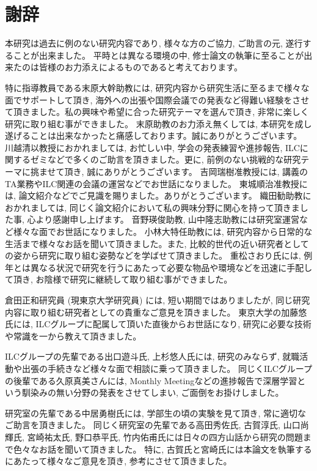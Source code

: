 
\clearpage

\chapter*{謝辞} \label{sec:Acknowledgement}

本研究は過去に例のない研究内容であり, 様々な方のご協力, ご助言の元, 遂行することが出来ました。
平時とは異なる環境の中, 修士論文の執筆に至ることが出来たのは皆様のお力添えによるものであると考えております。

特に指導教員である末原大幹助教には, 研究内容から研究生活に至るまで様々な面でサポートして頂き, 海外への出張や国際会議での発表など得難い経験をさせて頂きました。私の興味や希望に合った研究テーマを選んで頂き, 非常に楽しく研究に取り組む事ができました。
末原助教のお力添え無くしては, 本研究を成し遂げることは出来なかったと痛感しております。誠にありがとうございます。
川越清以教授におかれましては, お忙しい中, 学会の発表練習や進捗報告, ILCに関するゼミなどで多くのご助言を頂きました。更に, 前例のない挑戦的な研究テーマに挑ませて頂き, 誠にありがとうございます。
吉岡瑞樹准教授には, 講義のTA業務やILC関連の会議の運営などでお世話になりました。
東城順治准教授には, 論文紹介などでご見識を賜りました。ありがとうございます。
織田勧助教におかれましては, 同じく論文紹介において私の興味分野に関心を持って頂きました事, 心より感謝申し上げます。
音野瑛俊助教, 山中隆志助教には研究室運営など様々な面でお世話になりました。
小林大特任助教には, 研究内容から日常的な生活まで様々なお話を聞いて頂きました。また, 比較的世代の近い研究者としての姿から研究に取り組む姿勢などを学ばせて頂きました。
重松さおり氏には, 例年とは異なる状況で研究を行うにあたって必要な物品や環境などを迅速に手配して頂き, お陰様で研究に継続して取り組む事ができました。

倉田正和研究員 (現東京大学研究員) には, 短い期間ではありましたが, 同じ研究内容に取り組む研究者としての貴重なご意見を頂きました。
東京大学の加藤悠氏には, ILCグループに配属して頂いた直後からお世話になり, 研究に必要な技術や常識を一から教えて頂きました。

ILCグループの先輩である出口遊斗氏, 上杉悠人氏には, 研究のみならず, 就職活動や出張の手続きなど様々な面で相談に乗って頂きました。
同じくILCグループの後輩である久原真美さんには, Monthly Meetingなどの進捗報告で深層学習という馴染みの無い分野の発表をさせてしまい, ご面倒をお掛けしました。

研究室の先輩である中居勇樹氏には, 学部生の頃の実験を見て頂き, 常に適切なご助言を頂きました。
同じく研究室の先輩である高田秀佐氏, 古賀淳氏, 山口尚輝氏, 宮崎祐太氏, 野口恭平氏, 竹内佑甫氏には日々の四方山話から研究の問題まで色々なお話を聞いて頂きました。
特に, 古賀氏と宮崎氏には本論文を執筆するにあたって様々なご意見を頂き, 参考にさせて頂きました。

